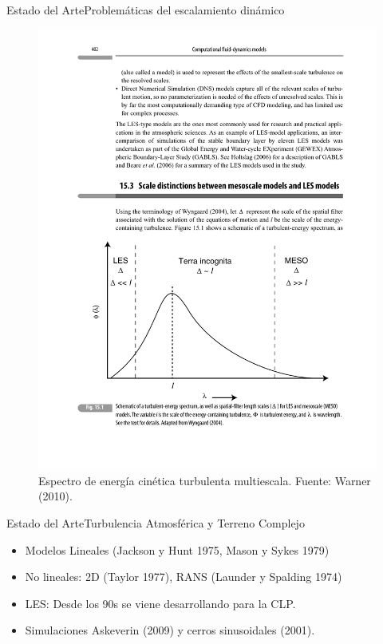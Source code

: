 \documentclass[mathserif,10pt]{beamer}
\begin{document}
\begin{frame}{Estado del Arte}{Problemáticas del escalamiento dinámico}
	\begin{figure}
		\centering
		\includegraphics[width=0.9\linewidth,trim={2cm 3.0cm 1.5cm 11.5cm},clip]{fig/02/terra_inc}
		\caption{Espectro de energía cinética turbulenta multiescala. Fuente: Warner (2010).}
		\label{fig:02_terra_inc}
	\end{figure}
\end{frame}

\begin{frame}{Estado del Arte}{Turbulencia Atmosférica y Terreno Complejo}
	\begin{itemize}
		\item Modelos Lineales (Jackson y Hunt 1975, Mason y Sykes 1979)
		\item No lineales: 2D (Taylor 1977), RANS (Launder y Spalding 1974)
		\item LES: Desde los 90s se viene desarrollando para la CLP.
		\item Simulaciones Askeverin (2009) y cerros sinusoidales (2001).
	\end{itemize}
\end{frame}
\end{document}
